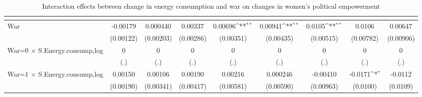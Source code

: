 \begin{table}[htbp]\centering
\def\sym#1{\ifmmode^{#1}\else\(^{#1}\)\fi}
\caption{Interaction effects between change in energy consumption and war on changes in women's political empowerment \label{interaction}}
\begin{tabular}{l*{8}{c}}
\hline\hline
                    &&&&&&&&\\
\hline
War                 &    -0.00179         &    0.000440         &     0.00337         &     0.00696\sym{**} &     0.00941\sym{**} &      0.0105\sym{**} &      0.0106         &     0.00647         \\
                    &   (0.00122)         &   (0.00203)         &   (0.00286)         &   (0.00351)         &   (0.00435)         &   (0.00515)         &   (0.00782)         &   (0.00906)         \\
[1em]
War=0 $\times$ S.Energy.consump,log&           0         &           0         &           0         &           0         &           0         &           0         &           0         &           0         \\
                    &         (.)         &         (.)         &         (.)         &         (.)         &         (.)         &         (.)         &         (.)         &         (.)         \\
[1em]
War=1 $\times$ S.Energy.consump,log&     0.00150         &     0.00106         &     0.00190         &     0.00216         &    0.000246         &    -0.00410         &     -0.0171\sym{*}  &     -0.0112         \\
                    &   (0.00190)         &   (0.00341)         &   (0.00417)         &   (0.00581)         &   (0.00590)         &   (0.00963)         &    (0.0100)         &    (0.0109)         \\

\end{tabular}
\end{table}
